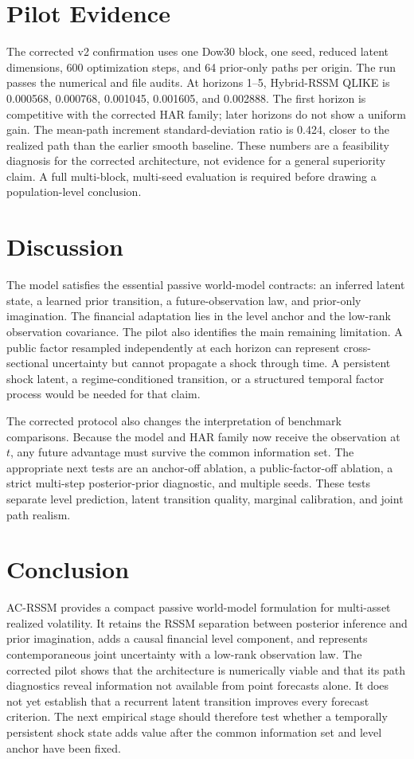 \documentclass[11pt]{article}
\begin{document}
\section{Pilot Evidence}
The corrected v2 confirmation uses one Dow30 block, one seed, reduced latent dimensions, 600 optimization steps, and 64 prior-only paths per origin. The run passes the numerical and file audits. At horizons 1--5, Hybrid-RSSM QLIKE is 0.000568, 0.000768, 0.001045, 0.001605, and 0.002888. The first horizon is competitive with the corrected HAR family; later horizons do not show a uniform gain. The mean-path increment standard-deviation ratio is 0.424, closer to the realized path than the earlier smooth baseline. These numbers are a feasibility diagnosis for the corrected architecture, not evidence for a general superiority claim. A full multi-block, multi-seed evaluation is required before drawing a population-level conclusion.

\section{Discussion}
The model satisfies the essential passive world-model contracts: an inferred latent state, a learned prior transition, a future-observation law, and prior-only imagination. The financial adaptation lies in the level anchor and the low-rank observation covariance. The pilot also identifies the main remaining limitation. A public factor resampled independently at each horizon can represent cross-sectional uncertainty but cannot propagate a shock through time. A persistent shock latent, a regime-conditioned transition, or a structured temporal factor process would be needed for that claim.

The corrected protocol also changes the interpretation of benchmark comparisons. Because the model and HAR family now receive the observation at $t$, any future advantage must survive the common information set. The appropriate next tests are an anchor-off ablation, a public-factor-off ablation, a strict multi-step posterior-prior diagnostic, and multiple seeds. These tests separate level prediction, latent transition quality, marginal calibration, and joint path realism.

\section{Conclusion}
AC-RSSM provides a compact passive world-model formulation for multi-asset realized volatility. It retains the RSSM separation between posterior inference and prior imagination, adds a causal financial level component, and represents contemporaneous joint uncertainty with a low-rank observation law. The corrected pilot shows that the architecture is numerically viable and that its path diagnostics reveal information not available from point forecasts alone. It does not yet establish that a recurrent latent transition improves every forecast criterion. The next empirical stage should therefore test whether a temporally persistent shock state adds value after the common information set and level anchor have been fixed.
\end{document}
